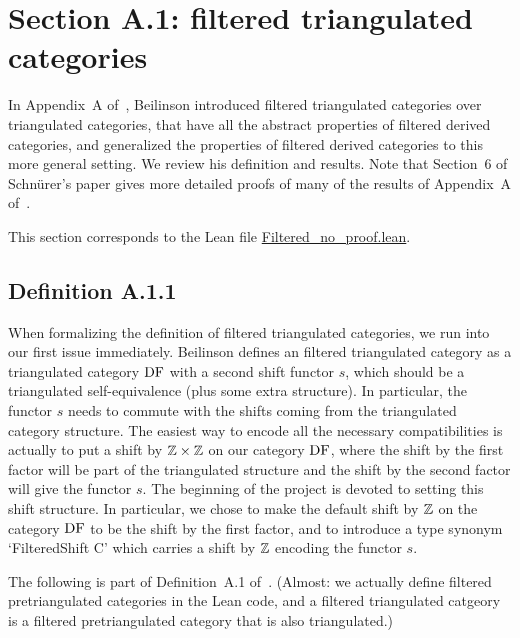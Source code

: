 \section{Section A.1: filtered triangulated categories}

In Appendix~A of~\cite{Be1}, Beilinson introduced filtered triangulated 
categories over triangulated categories, that have all the abstract properties of filtered
derived categories, and generalized the properties of filtered derived categories to this more general setting. We review his definition and results.
Note that Section~6 of Schn\"urer's paper \cite{Schnur} gives more detailed proofs of many of the results of Appendix~A of~\cite{Be1}.

This section corresponds to the Lean file \url{Filtered_no_proof.lean}.

\subsection{Definition A.1.1}

When formalizing the definition of filtered triangulated 
categories, we run into our first issue immediately. Beilinson defines an filtered triangulated category as a triangulated
category $\operatorname{DF}$ with a second shift functor $s$, which should be a triangulated self-equivalence (plus some extra structure). In particular,
the functor $s$ needs to commute with the shifts coming from the triangulated category structure. The easiest way to encode all
the necessary compatibilities is actually to put a shift by $\mathbb{Z} \times \mathbb{Z}$ on our category $\operatorname{DF}$, where the shift by the first factor
will be part of the triangulated structure and the shift by the second factor will give the functor $s$. The beginning of the project
is devoted to setting this shift structure. In particular, we chose to make the default shift by $\mathbb{Z}$ on the  category $\operatorname{DF}$ to be the
shift by the first factor, and to introduce a type synonym `FilteredShift C' which carries a shift by $\mathbb{Z}$ encoding the functor  $s$.

The following is part of Definition~A.1 of~\cite{Be1}. (Almost: we actually define filtered pretriangulated categories in the Lean code,
and a filtered triangulated catgeory is a filtered pretriangulated category that is also triangulated.)

